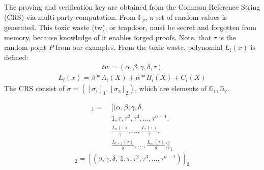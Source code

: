 The proving and verification key are obtained from the Common Reference String (CRS) via multi-party computation. From \begin{math}\mathbb{F}_p\end{math}, a set of random values is generated. This toxic waste (tw), or trapdoor, must be secret and forgotten from memory, because knowledge of it enables forged proofs. Note, that \begin{math}\tau\end{math} is the random point \(P\) from our examples. From the toxic waste, polynomial \(L_i(x)\) is defined:
\begin{align}
    tw = (\alpha, \beta, \gamma, \delta, \tau) 
\end{align}
\begin{align*}
    L_i(x) = \beta * A_i(X) + \alpha * B_i(X) + C_i(X)
\end{align*}
The CRS consist of \begin{math} \sigma = ([\sigma_1]_1,[\sigma_2]_2)\end{math}, which are elements of \begin{math} \mathbb{G}_1, \mathbb{G}_2\end{math}.

\begin{align}
    [\sigma_1]_1 = 
    &\ [(\alpha, \beta, \gamma, \delta, \\
    &\ 1, \tau, \tau^2, \tau^3, ..., \tau^{n-1}, \\
    &\ \frac{L_0(\tau)}{\gamma}, ..., \frac{L_l(\tau)}{\gamma}, \\
    &\ \frac{L_{l+1}(\tau)}{\delta}, ..., \frac{L_m(\tau)}{\delta})]_1 
\end{align}
\begin{align*}
    [\sigma_2]_2 = [(\beta, \gamma, \delta, \ 1, \tau, \tau^2, \tau^3, ..., \tau^{n-1})]_2
\end{align*}

